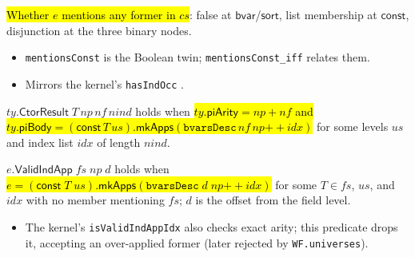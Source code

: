 \begin{definition}
\label{def:ind-mentions-const}
\leanok
{} 

 \hl{Whether $e$ mentions any former in $cs$}: false at $\mathsf{bvar}$/$\mathsf{sort}$,
list membership at $\mathsf{const}$, disjunction at the three binary nodes.
\begin{itemize}
\item {} \texttt{mentionsConst} is the Boolean twin; \texttt{mentionsConst\_iff}
relates them.
\item Mirrors the kernel's \texttt{hasIndOcc} .
\end{itemize}
\end{definition}

\begin{definition}
\label{def:ind-ctor-result}
\leanok
{} 

 $ty.\mathsf{CtorResult}\;T\,np\,nf\,nind$ holds when \hl{$ty.\mathsf{piArity}
= np+nf$ and $ty.\mathsf{piBody} = (\mathsf{const}\,T\,us).\mathsf{mkApps}(\texttt{bvarsDesc}\,nf\,np
\mathbin{+\!\!+} idx)$} for some levels $us$ and index list $idx$ of length $nind$.
\end{definition}

\begin{definition}
\label{def:ind-valid-ind-app}
\leanok
{} 

 $e.\mathsf{ValidIndApp}\;fs\;np\;d$ holds when
\hl{$e = (\mathsf{const}\;T\;us).\mathsf{mkApps}(\texttt{bvarsDesc}\;d\;np \mathbin{+\!\!+} idx)$}
for some $T \in fs$, $us$, and $idx$ with no member mentioning $fs$; $d$ is the offset from
the field level.
\begin{itemize}
\item {} The kernel's \texttt{isValidIndAppIdx}
 also checks exact arity; this predicate drops
it, accepting an over-applied former (later rejected by \texttt{WF.universes}).
\end{itemize}
\end{definition}

